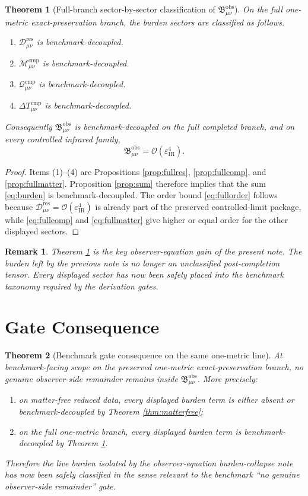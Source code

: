 \documentclass[11pt]{article}
\newcommand{\ResidualDec}{\mathcal D_{\mu\nu}^{\mathrm{res}}}
\newcommand{\CompMix}{\mathcal M_{\mu\nu}^{\mathrm{cmp}}}
\newcommand{\CompQuad}{\mathcal Q_{\mu\nu}^{\mathrm{cmp}}}
\newcommand{\DeltaTComp}{\Delta T_{\mu\nu}^{\mathrm{cmp}}}
\newcommand{\ObsBurden}{\mathfrak B_{\mu\nu}^{\mathrm{obs}}}
\newcommand{\epsIR}{\varepsilon_{\mathrm{IR}}}
\newtheorem{remark}{Remark}
\newtheorem{theorem}{Theorem}
\begin{document}
\begin{theorem}[Full-branch sector-by-sector classification of \(\ObsBurden\)]
\label{thm:full}
On the full one-metric exact-preservation branch, the burden sectors are classified as follows.
\begin{enumerate}
    \item \(\ResidualDec\) is benchmark-decoupled.
    \item \(\CompMix\) is benchmark-decoupled.
    \item \(\CompQuad\) is benchmark-decoupled.
    \item \(\DeltaTComp\) is benchmark-decoupled.
\end{enumerate}
Consequently \(\ObsBurden\) is benchmark-decoupled on the full completed branch, and on every controlled infrared family,
\begin{equation}
\ObsBurden=\mathcal O(\epsIR^4).
\label{eq:fullorder}
\end{equation}
\end{theorem}

\begin{proof}
Items (1)--(4) are Propositions \ref{prop:fullres}, \ref{prop:fullcomp}, and \ref{prop:fullmatter}. Proposition \ref{prop:sum} therefore implies that the sum \eqref{eq:burden} is benchmark-decoupled. The order bound \eqref{eq:fullorder} follows because \(\ResidualDec=\mathcal O(\epsIR^4)\) is already part of the preserved controlled-limit package, while \eqref{eq:fullcomp} and \eqref{eq:fullmatter} give higher or equal order for the other displayed sectors.
\end{proof}

\begin{remark}
Theorem \ref{thm:full} is the key observer-equation gain of the present note. The burden left by the previous note is no longer an unclassified post-completion tensor. Every displayed sector has now been safely placed into the benchmark taxonomy required by the derivation gates.
\end{remark}

\section{Gate Consequence}

\begin{theorem}[Benchmark gate consequence on the same one-metric line]
\label{thm:gate}
At benchmark-facing scope on the preserved one-metric exact-preservation branch, no genuine observer-side remainder remains inside \(\ObsBurden\). More precisely:
\begin{enumerate}
    \item on matter-free reduced data, every displayed burden term is either absent or benchmark-decoupled by Theorem \ref{thm:matterfree};
    \item on the full one-metric branch, every displayed burden term is benchmark-decoupled by Theorem \ref{thm:full}.
\end{enumerate}
Therefore the live burden isolated by the observer-equation burden-collapse note has now been safely classified in the sense relevant to the benchmark ``no genuine observer-side remainder'' gate.
\end{theorem}
\end{document}

